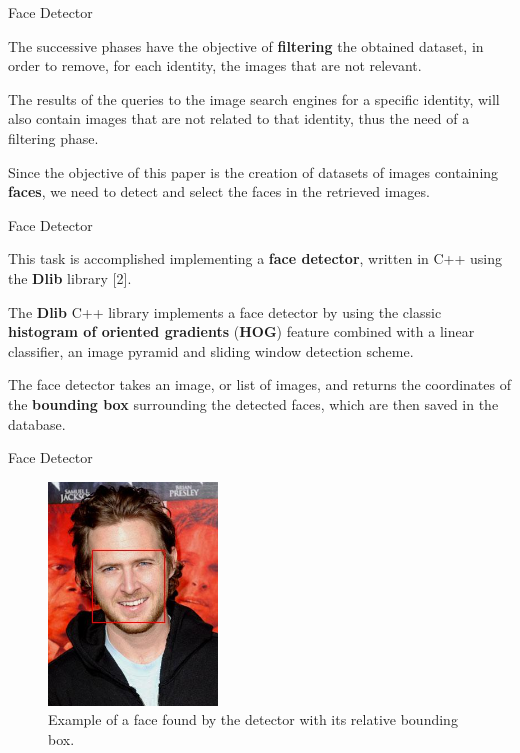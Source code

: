 \begin{tframe}{Face Detector}

The successive phases have the objective of \textbf{filtering} the obtained dataset, in order to remove, for each identity, the images that are not relevant. 

\vspace{0.1in}

The results of the queries to the image search engines for a specific identity, will also contain images that are not related to that identity, thus the need of a filtering phase. 

\vspace{0.1in}

Since the objective of this paper is the creation of datasets of images containing \textbf{faces}, we need to detect and select the faces in the retrieved images.

\end{tframe}


\begin{tframe}{Face Detector}

This task is accomplished implementing a \textbf{face detector}, written in C++ using the \textbf{Dlib} library [2]. 

\vspace{0.1in}

The \textbf{Dlib} C++ library implements a face detector by using the classic \textbf{histogram of oriented gradients} (\textbf{HOG}) feature combined with a linear classifier, an image pyramid and sliding window detection scheme.

\vspace{0.1in}

The face detector takes an image, or list of images, and returns the coordinates of the \textbf{bounding box} surrounding the detected faces, which are then saved in the database.

\end{tframe}


\begin{tframe}{Face Detector}

\begin{figure}[h]
\begin{center}
\includegraphics[width=0.4\textwidth]{images/image3.jpg}
\end{center}
  \caption{Example of a face found by the detector with its relative bounding box.}
\label{fig:validation}
\end{figure}

\end{tframe}